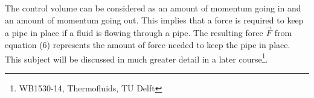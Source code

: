 \documentclass[11pt, a4paper]{article}
\begin{document}
The control volume can be considered as an amount of momentum going in and an amount of momentum going out.
This implies that a force is required to keep a pipe in place if a fluid is flowing through a pipe. 
The resulting force $\vec{F}$ from equation (6) represents the amount of force needed to keep the pipe 
in place. This subject will be discussed in much greater detail in a later course\footnote{WB1530-14, Thermofluids, TU Delft}.
\end{document}
